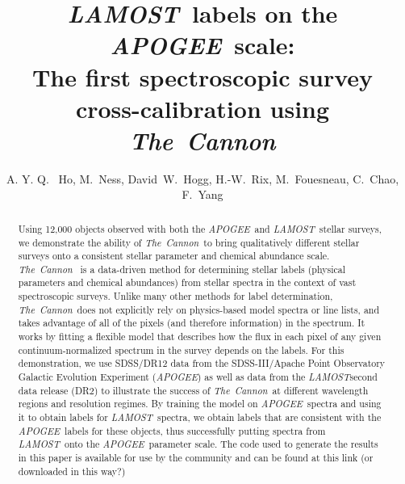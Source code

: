 \documentclass[12pt, preprint]{aastex}
\newcommand{\tc}{\textsl{The~Cannon}}
\newcommand{\apogee}{\textsl{APOGEE}}
\newcommand{\lamost}{\textsl{LAMOST}}
\begin{document}
\title{\lamost\ labels on the \apogee\ scale: \\ The first spectroscopic survey cross-calibration using \tc}
\author{A. Y. Q. ~Ho,
M.~Ness,
David~W.~Hogg, 
H.-W.~Rix,
M.~Fouesneau,
C.~Chao,
F.~Yang
}


\begin{abstract}

Using 12,000 objects observed with both the \apogee\ and \lamost\ stellar
surveys, we demonstrate the ability of \tc\ to bring qualitatively 
different stellar surveys onto a consistent stellar parameter and chemical 
abundance scale. 
\tc\ \citep{ness2015} is a data-driven method for determining stellar labels 
(physical parameters and chemical abundances) from stellar spectra in the 
context of vast spectroscopic surveys. 
Unlike many other methods for label determination, \tc\ does not 
explicitly rely on physics-based model spectra or line lists, and takes 
advantage of all of the pixels (and therefore information) in the spectrum. 
It works by fitting a flexible model that describes how the flux in each 
pixel of any given continuum-normalized spectrum in the survey depends on 
the labels. 
For this demonstration, we use SDSS/DR12 data from the 
SDSS-III/Apache Point Observatory Galactic Evolution Experiment (\apogee) 
as well as data from the \lamost second data release (DR2) to illustrate the 
success of \tc\ at different wavelength regions and resolution regimes. 
By training the model on \apogee\ spectra and using it to obtain labels for 
\lamost\ spectra, we obtain labels that are consistent
with the \apogee\ labels for these objects, thus successfully putting spectra
from \lamost\ onto the \apogee\ parameter scale. 
The code used to generate the results in this paper is available for use by
the community and can be found at this link (or downloaded in this way?)

\end{abstract}
\end{document}
